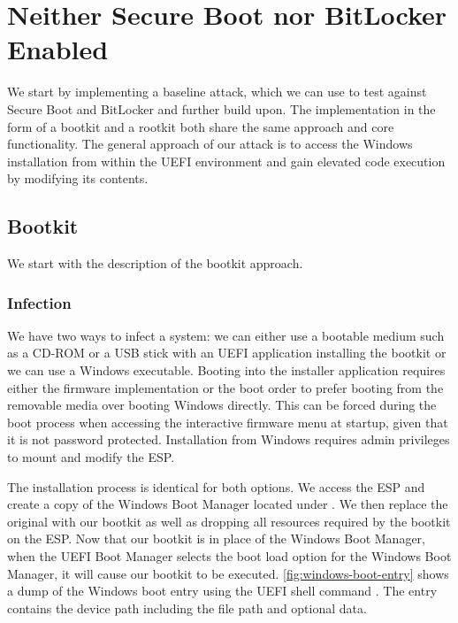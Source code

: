 
\section{Neither Secure Boot nor BitLocker Enabled}
\label{sec:attacks:neither}

We start by implementing a baseline attack, which we can use to test against Secure Boot and BitLocker and further build upon.
The implementation in the form of a bootkit and a rootkit both share the same approach and core functionality.
The general approach of our attack is to access the Windows installation from within the \ac{UEFI} environment and gain elevated code execution by modifying its contents.

\subsection{Bootkit}
\label{sec:attacks:neither:bootkit}

We start with the description of the bootkit approach.

\subsubsection{Infection}

We have two ways to infect a system: we can either use a bootable medium such as a CD-ROM or a \ac{USB} stick with an \ac{UEFI} application installing the bootkit or we can use a Windows executable.
Booting into the installer application requires either the firmware implementation or the boot order to prefer booting from the removable media over booting Windows directly.
This can be forced during the boot process when accessing the interactive firmware menu at startup, given that it is not password protected.
Installation from Windows requires admin privileges to mount and modify the \ac{ESP}.

The installation process is identical for both options.
We access the \ac{ESP} and create a copy of the Windows Boot Manager located under .
We then replace the original with our bootkit as well as dropping all resources required by the bootkit on the \ac{ESP}.
Now that our bootkit is in place of the Windows Boot Manager, when the \ac{UEFI} Boot Manager selects the boot load option for the Windows Boot Manager, it will cause our bootkit to be executed.
\autoref{fig:windows-boot-entry} shows a dump of the Windows boot entry using the \ac{UEFI} shell command .
The entry contains the device path including the file path and optional data.

